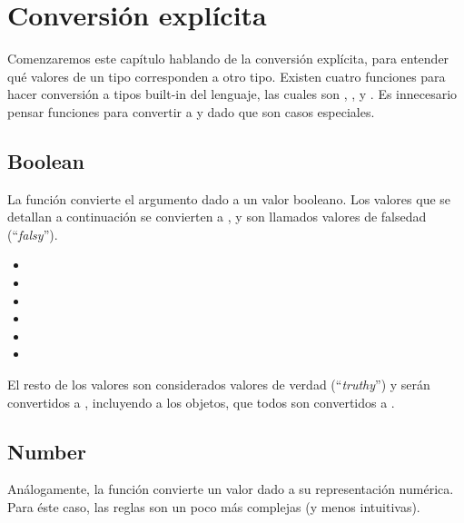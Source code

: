 \section{Conversión explícita}
\label{sec:conversionexplicita}

Comenzaremos este capítulo hablando de la conversión explícita, para entender qué valores de un tipo corresponden a otro tipo. Existen cuatro funciones para hacer conversión a tipos built-in del lenguaje, las cuales son  , ,  y . Es innecesario pensar funciones para convertir a  y  dado que son casos especiales. 

\subsection{Boolean} 

La función  convierte el argumento dado a un valor booleano. Los valores que se detallan a continuación se convierten a , y son llamados valores de falsedad ("`\textit{falsy}"').

\begin{itemize}
\item {}
\item {}
\item {}
\item {}
\item {}
\item {}
\end{itemize}

El resto de los valores son considerados valores de verdad ("`\textit{truthy}"') y serán convertidos a , incluyendo a los objetos, que todos son convertidos a .

\subsection{Number}

Análogamente, la función  convierte un valor dado a su representación numérica. Para éste caso, las reglas son un poco más complejas (y menos intuitivas).

